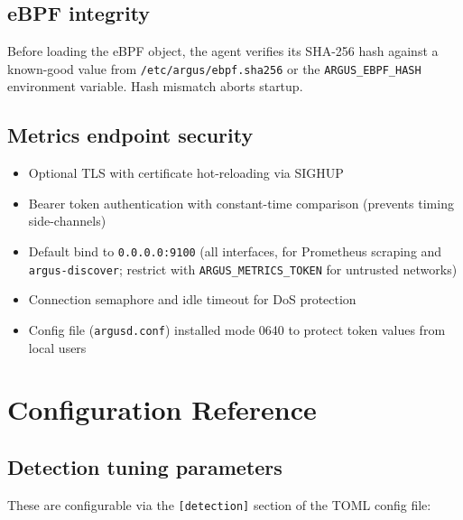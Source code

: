 \documentclass[11pt]{article}
\begin{document}
\subsection{eBPF integrity}

Before loading the eBPF object, the agent verifies its SHA-256 hash against
a known-good value from \texttt{/etc/argus/ebpf.sha256} or the
\texttt{ARGUS\_EBPF\_HASH} environment variable. Hash mismatch aborts
startup.

\subsection{Metrics endpoint security}

\begin{itemize}[nosep]
  \item Optional TLS with certificate hot-reloading via SIGHUP
  \item Bearer token authentication with constant-time comparison
        (prevents timing side-channels)
  \item Default bind to \texttt{0.0.0.0:9100} (all interfaces, for
        Prometheus scraping and \texttt{argus-discover}; restrict with
        \texttt{ARGUS\_METRICS\_TOKEN} for untrusted networks)
  \item Connection semaphore and idle timeout for DoS protection
  \item Config file (\texttt{argusd.conf}) installed mode 0640 to protect
        token values from local users
\end{itemize}


\section{Configuration Reference}
\label{sec:config-ref}

\subsection{Detection tuning parameters}

These are configurable via the \texttt{[detection]} section of the TOML
config file:
\end{document}
